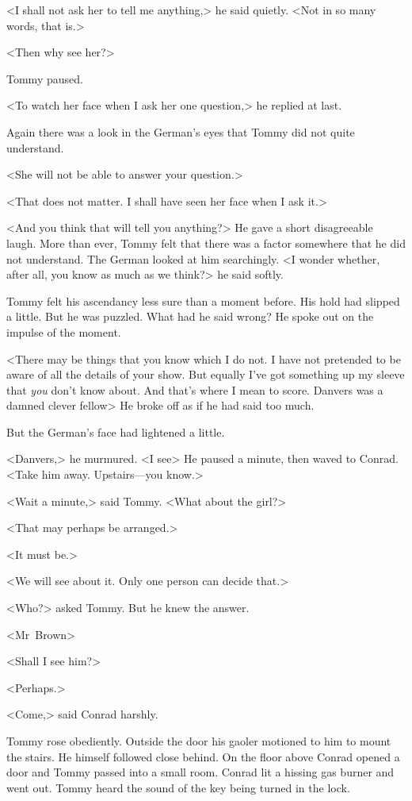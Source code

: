 <I shall not ask her to tell me anything,> he said quietly. <Not in so many words, that is.>

<Then why see her?>

Tommy paused.

<To watch her face when I ask her one question,> he replied at last.

Again there was a look in the German's eyes that Tommy did not quite understand.

<She will not be able to answer your question.>

<That does not matter. I shall have seen her face when I ask it.>

<And you think that will tell you anything?> He gave a short disagreeable laugh. More than ever, Tommy felt that there was a factor somewhere that he did not understand. The German looked at him searchingly. <I wonder whether, after all, you know as much as we think?> he said softly.

Tommy felt his ascendancy less sure than a moment before. His hold had slipped a little. But he was puzzled. What had he said wrong? He spoke out on the impulse of the moment.

<There may be things that you know which I do not. I have not pretended to be aware of all the details of your show. But equally I've got something up my sleeve that \emph{you} don't know about. And that's where I mean to score. Danvers was a damned clever fellow\longdash> He broke off as if he had said too much.

But the German's face had lightened a little.

<Danvers,> he murmured. <I see\longdash> He paused a minute, then waved to Conrad. <Take him away. Upstairs—you know.>

<Wait a minute,> said Tommy. <What about the girl?>

<That may perhaps be arranged.>

<It must be.>

<We will see about it. Only one person can decide that.>

<Who?> asked Tommy. But he knew the answer.

<Mr~Brown\longdash>

<Shall I see him?>

<Perhaps.>

<Come,> said Conrad harshly.

Tommy rose obediently. Outside the door his gaoler motioned to him to mount the stairs. He himself followed close behind. On the floor above Conrad opened a door and Tommy passed into a small room. Conrad lit a hissing gas burner and went out. Tommy heard the sound of the key being turned in the lock.

